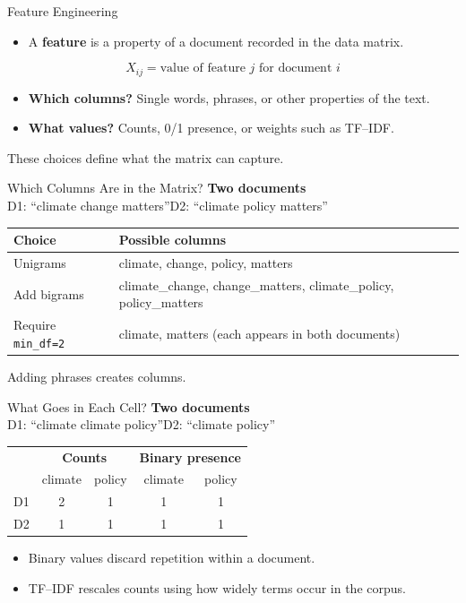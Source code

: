 \documentclass[11pt,aspectratio=43]{beamer}
\begin{document}
\begin{frame}{Feature Engineering}
\begin{itemize}
\item A \textbf{feature} is a property of a document recorded in the data matrix.
\end{itemize}
\vspace{.6em}
\[
X_{ij}=\text{value of feature }j\text{ for document }i
\]
\vspace{.6em}
\begin{itemize}
\item \textbf{Which columns?} Single words, phrases, or other properties of the text.
\item \textbf{What values?} Counts, 0/1 presence, or weights such as TF--IDF.
\end{itemize}
\vspace{1em}
These choices define what the matrix can capture.
\end{frame}

\begin{frame}{Which Columns Are in the Matrix?}
\textbf{Two documents}\\[.3em]
\quad D1: ``climate change matters''\qquad D2: ``climate policy matters''
\vspace{1em}
\small
\begin{tabular}{p{}p{}}
\toprule
\textbf{Choice} & \textbf{Possible columns}\\
\midrule
Unigrams & climate, change, policy, matters\\[.35em]
Add bigrams & climate\_change, change\_matters, climate\_policy, policy\_matters\\[.35em]
Require \texttt{min\_df=2} & climate, matters (each appears in both documents)\\
\bottomrule
\end{tabular}
\vspace{1em}
\normalsize
Adding phrases creates columns.
\end{frame}

\begin{frame}{What Goes in Each Cell?}
\textbf{Two documents}\\[.3em]
\quad D1: ``climate climate policy''\qquad D2: ``climate policy''
\vspace{1em}
\centering
\begin{tabular}{c|cc|cc}
& \multicolumn{2}{c|}{\textbf{Counts}} & \multicolumn{2}{c}{\textbf{Binary presence}}\\
& climate & policy & climate & policy\\
\midrule
D1 & 2 & 1 & 1 & 1\\
D2 & 1 & 1 & 1 & 1\\
\end{tabular}
\vspace{1.1em}
\begin{itemize}
\item Binary values discard repetition within a document.
\item TF--IDF rescales counts using how widely terms occur in the corpus.
\end{itemize}
\end{frame}
\end{document}
